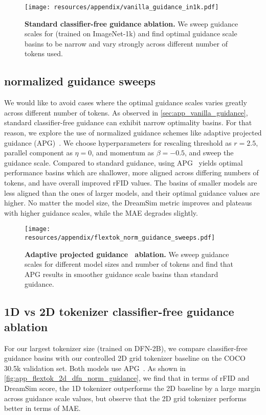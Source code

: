\begin{figure}[ht!]
\centering
\texttt{[image: resources/appendix/vanilla\_guidance\_in1k.pdf]}
\caption{
\textbf{Standard classifier-free guidance ablation.} We sweep guidance scales for \oursxlarge (trained on ImageNet-1k) and find optimal guidance scale basins to be narrow and vary strongly across different number of tokens used.
}
\label{fig:app_flextok_vanilla_guidance}
\end{figure}


\subsection{\ours normalized guidance sweeps}
\label{sec:app_flextok_norm_guidance}
We would like to avoid cases where the optimal guidance scales varies greatly across different number of \ours tokens. As observed in \cref{sec:app_vanilla_guidance}, standard classifier-free guidance can exhibit narrow optimality basins. For that reason, we explore the use of normalized guidance schemes like adaptive projected guidance (APG)~\cite{Sadat2024NormGuidance}. We choose hyperparameters for rescaling threshold as $r=2.5$, parallel component as $\eta=0$, and momentum as $\beta=-0.5$, and sweep the guidance scale. Compared to standard guidance, using APG~\cite{Sadat2024NormGuidance} yields optimal performance basins which are shallower, more aligned across differing numbers of tokens, and have overall improved rFID values. The basins of smaller \ours models are less aligned than the ones of larger models, and their optimal guidance values are higher. No matter the model size, the DreamSim metric improves and plateaus with higher guidance scales, while the MAE degrades slightly.

\begin{figure}[ht!]
\centering
\texttt{[image: resources/appendix/flextok\_norm\_guidance\_sweeps.pdf]}
\caption{
\textbf{Adaptive projected guidance~\cite{Sadat2024NormGuidance} ablation.} We sweep guidance scales for different \ours model sizes and number of tokens and find that APG results in smoother guidance scale basins than standard guidance.
}
\label{fig:app_flextok_norm_guidance}
\end{figure}


\subsection{1D vs 2D tokenizer classifier-free guidance ablation}
\label{sec:app_1d_vs_2d_guidance}
For our largest tokenizer size \oursxlarge (trained on DFN-2B), we compare classifier-free guidance basins with our controlled 2D grid tokenizer baseline on the COCO 30.5k validation set. Both models use APG~\cite{Sadat2024NormGuidance}. As shown in \cref{fig:app_flextok_2d_dfn_norm_guidance}, we find that in terms of rFID and DreamSim score, the 1D tokenizer outperforms the 2D baseline by a large margin across guidance scale values, but observe that the 2D grid tokenizer performs better in terms of MAE.

